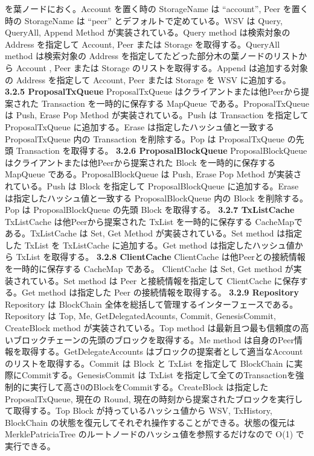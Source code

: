 を葉ノードにおく。Account を置く時の StorageName は ``account'', Peer
を置く時の StorageName は ``peer'' とデフォルトで定めている。WSV は
Query, QueryAll, Append Method が実装されている。Query method
は検索対象の Address を指定して Account, Peer または Storage
を取得する。QueryAll method は検索対象の Address
を指定してたどった部分木の葉ノードのリストから Account , Peer または
Storage のリストを取得する。Append は追加する対象の Address を指定して
Account, Peer または Storage を WSV に追加する。 \textbf{3.2.5
ProposalTxQueue} ProposalTxQueue
はクライアントまたは他Peerから提案された Transaction を一時的に保存する
MapQueue である。ProposalTxQueue は Push, Erase Pop Method
が実装されている。Push は Transaction を指定して ProposalTxQueue
に追加する。Erase は指定したハッシュ値と一致する ProposalTxQueue 内の
Transaction を削除する。Pop は ProposalTxQueue の先頭 Transaction
を取得する。 \textbf{3.2.6 ProposalBlockQueue} ProposalBlockQueue
はクライアントまたは他Peerから提案された Block を一時的に保存する
MapQueue である。ProposalBlockQueue は Push, Erase Pop Method
が実装されている。Push は Block を指定して ProposalBlockQueue
に追加する。Erase は指定したハッシュ値と一致する ProposalBlockQueue 内の
Block を削除する。Pop は ProposalBlockQueue の先頭 Block を取得する。
\textbf{3.2.7 TxListCache} TxListCache は他Peerから提案された TxList
を一時的に保存する CacheMapである。TxListCache は Set, Get Method
が実装されている。Set method は指定した TxList を TxListCache
に追加する。Get method は指定したハッシュ値から TxList を取得する。
\textbf{3.2.8 ClientCache} ClientCache
は他Peerとの接続情報を一時的に保存する CacheMap である。 ClientCache は
Set, Get method が実装されている。Set method は Peer
と接続情報を指定して ClientCache に保存する。Get method は指定した Peer
の接続情報を取得する。 \textbf{3.2.9 Repository} Repository は
BlockChain 全体を総括して管理するインターフェースである。Repository は
Top, Me, GetDelegatedAcounts, Commit, GenesisCommit, CreateBlock method
が実装されている。Top method
は最新且つ最も信頼度の高いブロックチェーンの先頭のブロックを取得する。Me
method は自身のPeer情報を取得する。GetDelegateAccounts
はブロックの提案者として適当なAccountのリストを取得する。Commit は Block
と TxList を指定して BlockChain に実際にCommitする。GenesisCommit は
TxList
を指定して全てのTransactionを強制的に実行して高さ0のBlockをCommitする。CreateBlock
は指定した ProposalTxQueue, 現在の Round,
現在の時刻から提案されたブロックを実行して取得する。Top Block
が持っているハッシュ値から WSV, TxHistory, BlockChain
の状態を復元してそれぞれ操作することができる。状態の復元は
MerklePatriciaTree のルートノードのハッシュ値を参照するだけなので O(1)
で実行できる。

